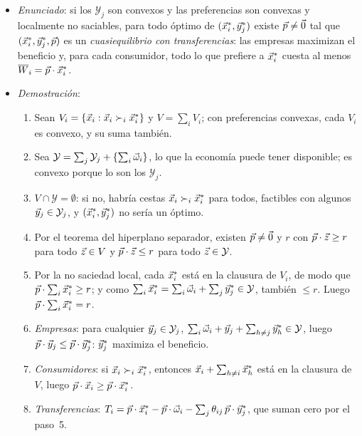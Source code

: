 \documentclass[11pt]{article}
\begin{document}
\begin{itemize}
\item \emph{Enunciado}: si los $\mathcal{Y}_j$ son convexos y las preferencias son convexas y localmente no saciables, para todo óptimo de  $(\vec{x}^*_i,\vec{y}^*_j)$ existe $\vec{p}\neq\vec{0}$ tal que $(\vec{x}^*_i,\vec{y}^*_j,\vec{p})$ es un \emph{cuasiequilibrio con transferencias}: las empresas maximizan el beneficio y, para cada consumidor, todo lo que prefiere a $\vec{x}^*_i$ cuesta al menos $\overline{W}_i=\vec{p}\cdot\vec{x}^*_i$.
\item \emph{Demostración}:
  \begin{enumerate}
  \item Sean $V_i=\{\vec{x}_i:\vec{x}_i\succ_i\vec{x}^*_i\}$ y $V=\sum_iV_i$; con preferencias convexas, cada $V_i$ es convexo, y su suma también.
  \item Sea $\mathcal{Y}=\sum_j\mathcal{Y}_j+\{\sum_i\vec{\omega}_i\}$, lo que la economía puede tener disponible; es convexo porque lo son los $\mathcal{Y}_j$.
  \item $V\cap\mathcal{Y}=\emptyset$: si no, habría cestas $\vec{x}_i\succ_i\vec{x}^*_i$ para todos, factibles con algunos $\vec{y}_j\in\mathcal{Y}_j$, y $(\vec{x}^*_i,\vec{y}^*_j)$ no sería un óptimo.
  \item Por el teorema del hiperplano separador\nocite{Minkowski1911Theorie}, existen $\vec{p}\neq\vec{0}$ y $r$ con $\vec{p}\cdot\vec{z}\geq r$ para todo $\vec{z}\in V$ y $\vec{p}\cdot\vec{z}\leq r$ para todo $\vec{z}\in\mathcal{Y}$.
  \item Por la no saciedad local, cada $\vec{x}^*_i$ está en la clausura de $V_i$, de modo que $\vec{p}\cdot\sum_i\vec{x}^*_i\geq r$; y como $\sum_i\vec{x}^*_i=\sum_i\vec{\omega}_i+\sum_j\vec{y}^*_j\in\mathcal{Y}$, también $\leq r$. Luego $\vec{p}\cdot\sum_i\vec{x}^*_i=r$.
  \item \emph{Empresas}: para cualquier $\vec{y}_j\in\mathcal{Y}_j$, $\sum_i\vec{\omega}_i+\vec{y}_j+\sum_{h\neq j}\vec{y}^*_h\in\mathcal{Y}$, luego $\vec{p}\cdot\vec{y}_j\leq\vec{p}\cdot\vec{y}^*_j$: $\vec{y}^*_j$ maximiza el beneficio.
  \item \emph{Consumidores}: si $\vec{x}_i\succ_i\vec{x}^*_i$, entonces $\vec{x}_i+\sum_{h\neq i}\vec{x}^*_h$ está en la clausura de $V$, luego $\vec{p}\cdot\vec{x}_i\geq\vec{p}\cdot\vec{x}^*_i$.
  \item \emph{Transferencias}: $T_i=\vec{p}\cdot\vec{x}^*_i-\vec{p}\cdot\vec{\omega}_i-\sum_j\theta_{ij}\,\vec{p}\cdot\vec{y}^*_j$, que suman cero por el paso~5.\findemo

\end{enumerate}
\end{itemize}
\end{document}
